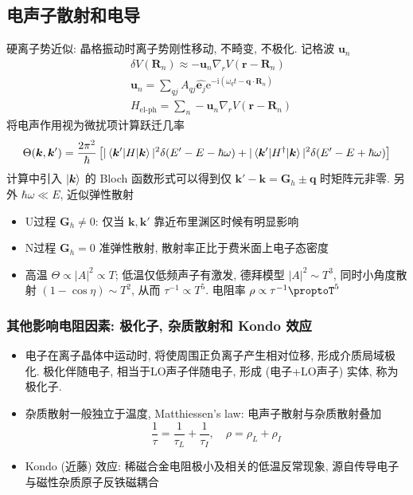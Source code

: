 \documentclass[11pt,a4paper]{article}%
\numberwithin{equation}{section}%
\renewcommand*{\vec}[1]{\bm{#1}}%
\newcommand\mi{\mathrm{i}}
\newcommand\e{\mathrm{e}}%
\begin{document}
\subsection{电声子散射和电导} %
\label{sub:e_phonon}
硬离子势近似: 晶格振动时离子势刚性移动, 不畸变, 不极化. 记格波 $\vec u_n$
\begin{align}
	&\delta V(\vec R_n) \approx - \vec u_n\nabla_r V(\vec r - \vec R_n) \\
	&\vec u_n = \sum_{qj}A_{qj}\hat{\vec e_j}\e^{-\mi(\omega_q t - \vec q\cdot\vec R_n)} \\
	&H_{\mbox{el-ph}} = \sum_n - \vec u_n\nabla_r V(\vec r - \vec R_n)
\end{align}
将电声作用视为微扰项计算跃迁几率
\begin{equation}
 	\Theta(\vec k,\vec k') = \frac{2\pi^2}{\hbar}\left[|\braket{\vec k'|H|\vec k}|^2\delta(E' - E - \hbar\omega) + |\braket{\vec k'|H^\dagger|\vec k}|^2\delta(E' - E + \hbar\omega)\right]
\end{equation}
计算中引入 $\ket{\vec k}$ 的 Bloch 函数形式可以得到仅 $\vec k' - \vec k = \vec G_h\pm \vec q$ 时矩阵元非零. 另外 $\hbar\omega \ll E$, 近似弹性散射
\begin{itemize}
	\item U过程 $\vec G_h\neq 0$: 仅当 $\vec k,\vec k'$ 靠近布里渊区时候有明显影响
	\item N过程 $\vec G_h = 0$ 准弹性散射, 散射率正比于费米面上电子态密度
	\item 高温 $\Theta\propto|A|^2\propto T$; 低温仅低频声子有激发, 德拜模型 $|A|^2\sim T^3$, 同时小角度散射 $(1-\cos\eta)\sim T^2$, 从而 $\tau ^{-1}\propto T^5$. 电阻率 $\rho\propto\tau^{-1}\proptoT^5$
\end{itemize}
\subsubsection{其他影响电阻因素: 极化子, 杂质散射和 Kondo 效应} %
\label{ssub:other}
\begin{itemize}
	\item 电子在离子晶体中运动时, 将使周围正负离子产生相对位移, 形成介质局域极化. 极化伴随电子, 相当于LO声子伴随电子, 形成 (电子+LO声子) 实体, 称为极化子.
	\item 杂质散射一般独立于温度, Matthiessen's law: 电声子散射与杂质散射叠加
	\begin{equation}
		\frac 1\tau = \frac 1{\tau_L} + \frac 1{\tau_I}, \quad \rho = \rho_L + \rho_I
	\end{equation}
	\item Kondo (近藤) 效应: 稀磁合金电阻极小及相关的低温反常现象, 源自传导电子与磁性杂质原子反铁磁耦合
\end{itemize}
\end{document}
